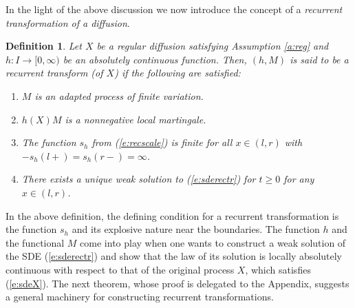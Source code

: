 \documentclass[11pt,reqno]{amsart}
\numberwithin{equation}{section}
\newtheorem{definition}{Definition}[section]
\begin{document}
In the light of the above discussion we  now introduce the concept of a {\em recurrent transformation of a diffusion}.
\begin{definition} Let $X$ be a regular  diffusion satisfying  Assumption \ref{a:reg} and  $h:I\to [0,\infty)$ be an absolutely continuous function. Then, $(h,M)$ is said to be a recurrent transform (of $X$) if the following are satisfied:
\begin{enumerate}
\item $M$ is an adapted process of finite variation.
\item $h(X)M$ is a nonnegative local martingale. 
\item The function $s_h$ from (\ref{e:recscale}) is finite for all $x \in (l,r)$ with $-s_h(l+)=s_h(r-)=\infty$.
\item There exists a unique weak solution to (\ref{e:sderectr}) for $t \geq 0$ for any $x \in (l,r)$.
\end{enumerate}
\end{definition}
In the above definition, the defining condition for a recurrent transformation is the function $s_h$ and its explosive nature near the boundaries. The function $h$ and  the  functional $M$ come  into play when one wants to construct a weak solution of the SDE (\ref{e:sderectr}) and show that the law of its solution is locally absolutely continuous with respect to that of the original process $X$, which satisfies (\ref{e:sdeX}). The next theorem, whose proof is delegated to the Appendix, suggests a general machinery for constructing recurrent transformations.
\end{document}
